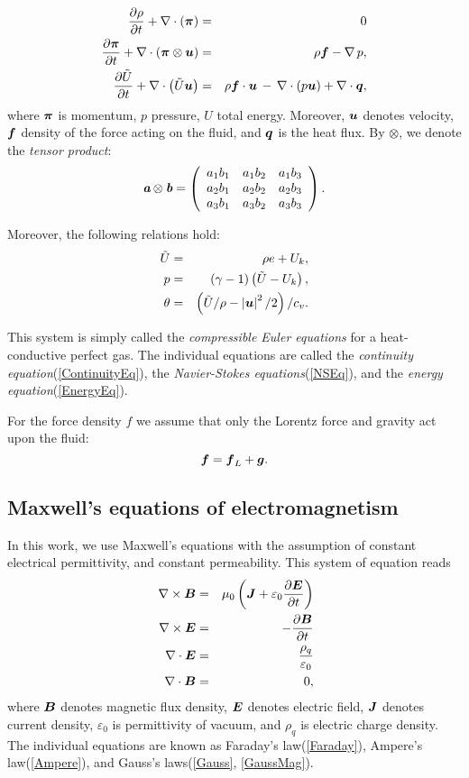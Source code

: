\begin{eqnarray}
\label{ContinuityEq} \frac{\partial{\rho}}{\partial{t}} + \nabla\cdot\left(\mbox{\boldmath $\pi$}\right) & = & 0\\
\label{NSEq} \frac{\partial{\mbox{\boldmath $\pi$}}}{\partial{t}} + \nabla\cdot\left(\mbox{\boldmath $\pi$}\otimes\mbox{\boldmath $u$}\right)& = & \rho\mbox{\boldmath $f$} - \nabla\,p,\\
\label{EnergyEq} \frac{\partial{\tilde{U}}}{\partial{t}} + \nabla\cdot\left({\tilde{U}}\mbox{\boldmath $u$}\right) & = & \rho\mbox{\boldmath $f$}\cdot\mbox{\boldmath $u$} \,-\,\nabla\cdot\left({p}\mbox{\boldmath $u$}\right) + \nabla\cdot\mbox{\boldmath $q$},
\end{eqnarray}
where $\mbox{\boldmath $\pi$}$ is momentum, $p$ pressure, $U$ total energy. Moreover, $\mbox{\boldmath $u$}$ denotes velocity, $\mbox{\boldmath $f$}$ density of the force acting on the fluid, and $\mbox{\boldmath $q$}$ is the heat flux. By $\otimes$, we denote the \textit{tensor product}:
\begin{displaymath}
\textit{\textbf{a}}\otimes\textit{\textbf{b}} =
\left(
\begin{array}{ccc}
a_1b_1 & a_1b_2 & a_1b_3 \\
a_2b_1 & a_2b_2 & a_2b_3 \\
a_3b_1 & a_3b_2 & a_3b_3
\end{array}
\right).
\end{displaymath}

Moreover, the following relations hold:
\begin{eqnarray}
\tilde{U} & = & \rho e + U_k,\\
p & = & \left({}\gamma-1\right)\left({\tilde{U}}-U_k\right), \label{therm_1}\\
\theta & = & \left({\tilde{U}}/{\rho}-\left|\mbox{\boldmath $u$}\right|^2/2\right)/{c_v}.
\end{eqnarray}

This system is simply called the \textit{compressible Euler equations} for a heat-conductive perfect gas. The individual equations are called the \textit{continuity equation}(\ref{ContinuityEq}), the \textit{Navier-Stokes equations}(\ref{NSEq}), and the \textit{energy equation}(\ref{EnergyEq}).

For the force density $f$ we assume that only the Lorentz force and gravity act upon the fluid:
$$
\label{ForceEq} \mbox{\boldmath $f$} = \mbox{\boldmath $f$}_L + \mbox{\boldmath $g$}.
$$


\subsection{Maxwell's equations of electromagnetism}
In this work, we use Maxwell's equations with the assumption of constant electrical permittivity, and constant permeability. This system of equation reads
\begin{eqnarray}
\label{Ampere} \nabla \times \mbox{\boldmath $B$} & = & \mu_0 \left( \mbox{\boldmath $J$} + \varepsilon_0 \frac{\partial{\mbox{\boldmath $E$}}}{\partial{t}}\right)\\\
\label{Faraday} \nabla \times \mbox{\boldmath $E$} & = & -\frac{\partial{\mbox{\boldmath $B$}}}{\partial{t}}\\
\label{Gauss} \nabla \cdot \mbox{\boldmath $E$} & = & \frac{\rho_q}{\varepsilon_0}\\
\label{GaussMag} \nabla \cdot \mbox{\boldmath $B$} & = &0,
\end{eqnarray}
where $\mbox{\boldmath $B$}$ denotes magnetic flux density, $\mbox{\boldmath $E$}$ denotes electric field, $\mbox{\boldmath $J$}$ denotes current density, $\varepsilon_0$ is permittivity of vacuum, and $\rho_q$ is electric charge density.
The individual equations are known as Faraday's law(\ref{Faraday}), Ampere's law(\ref{Ampere}), and Gauss's laws(\ref{Gauss}, \ref{GaussMag}).


